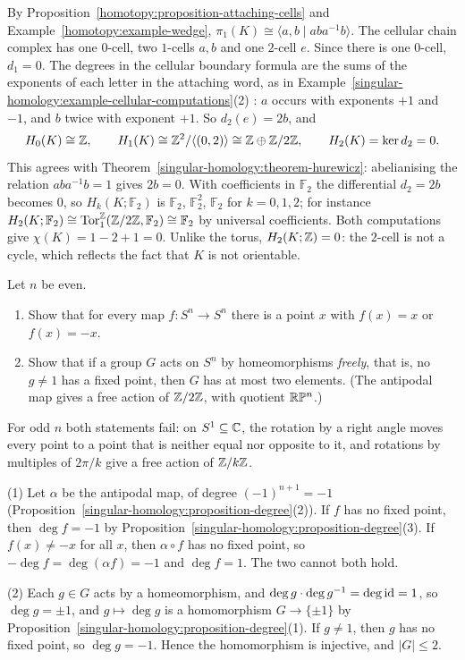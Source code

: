 \begin{solution}
By Proposition~\ref{homotopy:proposition-attaching-cells} and Example~\ref{homotopy:example-wedge}, $\pi_1(K) \cong \langle a, b \mid aba^{-1}b \rangle$. The cellular chain complex
has one $0$-cell, two $1$-cells $a, b$ and one $2$-cell $e$. Since there is one $0$-cell, $d_1 = 0$. The degrees in the cellular boundary formula are the sums of the
exponents of each letter in the attaching word, as in Example~\ref{singular-homology:example-cellular-computations}(2) \cite[Section 2.2]{hatcher-at}: $a$ occurs with
exponents $+1$ and $-1$, and $b$ twice with exponent $+1$. So $d_2(e) = 2b$, and
\[
H_0(K) \cong \mathbb{Z}, \qquad H_1(K) \cong \mathbb{Z}^2/\langle(0, 2)\rangle \cong \mathbb{Z} \oplus \mathbb{Z}/2\mathbb{Z}, \qquad H_2(K) = \ker d_2 = 0.
\]
This agrees with Theorem~\ref{singular-homology:theorem-hurewicz}: abelianising the relation $aba^{-1}b = 1$ gives $2b = 0$. With coefficients in $\mathbb{F}_2$ the differential
$d_2 = 2b$ becomes $0$, so $H_k(K; \mathbb{F}_2)$ is $\mathbb{F}_2$, $\mathbb{F}_2^2$, $\mathbb{F}_2$ for $k = 0, 1, 2$; for instance $H_2(K; \mathbb{F}_2) \cong \operatorname{Tor}_1^{\mathbb{Z}}(\mathbb{Z}/2\mathbb{Z}, \mathbb{F}_2) \cong \mathbb{F}_2$ by
universal coefficients. Both computations give $\chi(K) = 1 - 2 + 1 = 0$. Unlike the torus, $H_2(K; \mathbb{Z}) = 0$: the $2$-cell is not a cycle, which reflects the fact that $K$ is not
orientable.
\end{solution}

\begin{exercise}\label{singular-homology:exercise-free-actions}
Let $n$ be even.
\begin{enumerate}
\item Show that for every map $f \colon S^n \to S^n$ there is a point $x$ with $f(x) = x$ or $f(x) = -x$.
\item Show that if a group $G$ acts on $S^n$ by homeomorphisms \emph{freely}, that is, no $g \neq 1$ has a fixed point, then $G$ has at most two elements. (The
antipodal map gives a free action of $\mathbb{Z}/2\mathbb{Z}$, with quotient $\mathbb{R}\mathbb{P}^n$.)
\end{enumerate}
For odd $n$ both statements fail: on $S^1 \subseteq \mathbb{C}$, the rotation by a right angle moves every point to a point that is neither equal nor opposite to it, and
rotations by multiples of $2\pi/k$ give a free action of $\mathbb{Z}/k\mathbb{Z}$.
\end{exercise}

\begin{solution}
(1) Let $\alpha$ be the antipodal map, of degree $(-1)^{n+1} = -1$ (Proposition~\ref{singular-homology:proposition-degree}(2)). If $f$ has no fixed point, then
$\deg f = -1$ by Proposition~\ref{singular-homology:proposition-degree}(3). If $f(x) \neq -x$ for all $x$, then $\alpha \circ f$ has no fixed point, so
$-\deg f = \deg(\alpha f) = -1$ and $\deg f = 1$. The two cannot both hold.

(2) Each $g \in G$ acts by a homeomorphism, and $\deg g \cdot \deg g^{-1} = \deg\mathrm{id} = 1$, so $\deg g = \pm1$, and $g \mapsto \deg g$ is a homomorphism $G \to \{\pm1\}$ by
Proposition~\ref{singular-homology:proposition-degree}(1). If $g \neq 1$, then $g$ has no fixed point, so $\deg g = -1$. Hence the homomorphism is injective, and $|G| \leq 2$.
\end{solution}
